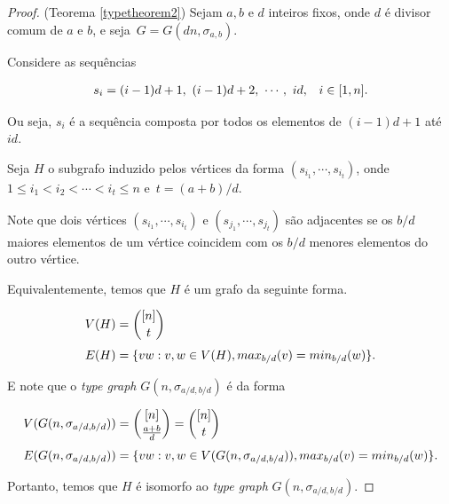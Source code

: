 \begin{proof}(Teorema \ref{typetheorem2})
Sejam $a,b$ e $d$ inteiros fixos, onde $d$ é divisor comum de $a$ e $b$, e seja~$G = G(dn,\sigma_{a,b})$.

Considere as sequências

\begin{equation*}
\setlength{\jot}{6pt}
\begin{aligned}
s_i &= (i-1)d+1,\ (i-1)d+2,\ \cdots,\ id, & i\in [1,n].
\end{aligned}
\end{equation*}

Ou seja, $s_i$ é a sequência composta por todos os elementos de $(i-1)d+1$ até $id$.

Seja $H$ o subgrafo induzido pelos vértices da forma $(s_{i_1}, \cdots, s_{i_t})$, onde $1\leq i_1 < i_2 < \cdots < i_t\leq n$ e~$t = (a+b)/d$.

Note que dois vértices $(s_{i_1}, \cdots, s_{i_t})$ e $(s_{j_1}, \cdots, s_{j_t})$ são adjacentes se os $b/d$ maiores elementos de um vértice coincidem com os $b/d$ menores elementos do outro vértice.


Equivalentemente, temos que $H$ é um grafo da seguinte forma.

\begin{equation*}
\setlength{\jot}{6pt}
\begin{aligned}
V(H) &= \binom{[n]}{t}\\
E(H) &= \{vw : v,w\in V(H), max_{b/d}(v) = min_{b/d}(w)\}.
\end{aligned}
\end{equation*}

E note que o \textit{type graph} $G(n,\sigma_{a/d,b/d})$ é da forma

\begin{equation*}
\setlength{\jot}{6pt}
\begin{aligned}
V(G(n,\sigma_{a/d,b/d})) &= \binom{[n]}{\frac{a+b}{d}} = \binom{[n]}{t}\\
E(G(n,\sigma_{a/d,b/d})) &= \{vw : v,w\in V(G(n,\sigma_{a/d,b/d})), max_{b/d}(v) = min_{b/d}(w)\}.
\end{aligned}
\end{equation*}

Portanto, temos que $H$ é isomorfo ao \textit{type graph} $G(n,\sigma_{a/d,b/d})$.
\end{proof}

